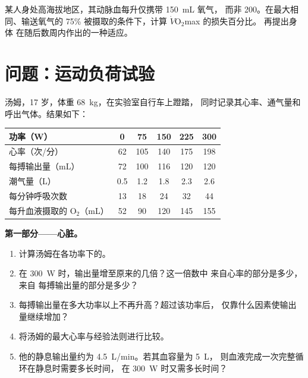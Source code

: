 \begin{exercise}[$\star\star\star$]\label{exo:g10:heart-lungs-effort:15}
某人身处高海拔地区，其动脉血每升仅携带 \qty{150}{mL} 氧气，
而非 \num{200}。在最大相同、输送氧气的 75\%
被摄取的条件下，计算 $\dot V\!\mathrm{O_2}$max 的损失百分比。
再提出身体
在随后数周内作出的一种适应。
\end{exercise}

\section{问题：运动负荷试验}

\begin{problem}
\label{pb:g10:heart-lungs-effort:1}
汤姆，17 岁，体重 \qty{68}{kg}，在实验室自行车上蹬踏，
同时记录其心率、通气量和呼出气体。结果如下：

\begin{center}
\begin{tabular}{lccccc}
功率（W） & 0 & 75 & 150 & 225 & 300 \\ \hline
心率（次/分） & 62 & 105 & 140 & 175 & 198 \\
每搏输出量（mL） & 72 & 100 & 116 & 120 & 120 \\
潮气量（L） & 0.5 & 1.2 & 1.8 & 2.3 & 2.6 \\
每分钟呼吸次数 & 13 & 18 & 24 & 32 & 44 \\
每升血液摄取的 $\mathrm{O_2}$（mL） & 52 & 90 & 120 & 145 & 155 \\
\end{tabular}
\end{center}

\medskip
\noindent\textbf{第一部分——心脏。}
\begin{enumerate}
  \item 计算汤姆在各功率下的。
  \item 在 \qty{300}{W} 时，输出量增至原来的几倍？这一倍数中
        来自心率的部分是多少，来自
        每搏输出量的部分是多少？
  \item 每搏输出量在多大功率以上不再升高？超过该功率后，
        仅靠什么因素使输出量继续增加？
  \item 将汤姆的最大心率与经验法则进行比较。
  \item 他的静息输出量约为 \qty{4.5}{L/min}。若其血容量为 \qty{5}{L}，
        则血液完成一次完整循环在静息时需要多长时间，
        在 \qty{300}{W} 时又需多长时间？
\end{enumerate}


\end{problem}
